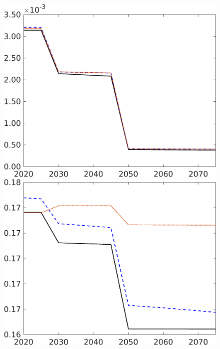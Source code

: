 \begin{figure}[h!!]
\begin{minipage}[]{0.32\textwidth}
	\end{minipage}
	\begin{minipage}[]{0.32\textwidth}
		\includegraphics[width=1\textwidth]{../../codding_model/own_basedOnFried/optimalPol_elastS_DisuSci/figures/all_1705/Lf_CompEffOPT_T_NoTaus_spillover0_sep1_BN0_ineq0_etaa0.79_lgd0.png}
	\end{minipage}
	\begin{minipage}[]{0.32\textwidth}
		\includegraphics[width=1\textwidth]{../../codding_model/own_basedOnFried/optimalPol_elastS_DisuSci/figures/all_1705/Ln_CompEffOPT_T_NoTaus_spillover0_sep1_BN0_ineq0_etaa0.79_lgd0.png}
	\end{minipage}
\end{figure}


